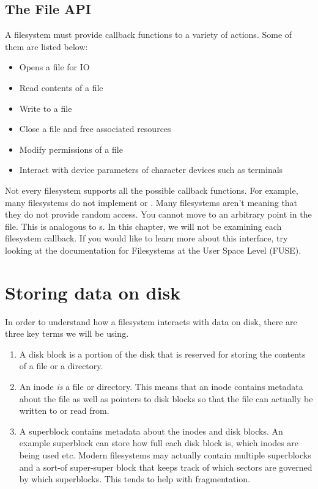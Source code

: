 \subsection{The File API}

A filesystem must provide callback functions to a variety of actions.
Some of them are listed below:

\begin{itemize}
  \item {} Opens a file for IO
  \item {} Read contents of a file
  \item {} Write to a file
  \item {} Close a file and free associated resources
  \item {} Modify permissions of a file
  \item {} Interact with device parameters of character devices such as terminals
\end{itemize}

Not every filesystem supports all the possible callback functions.
For example, many filesystems do not implement  or .
Many filesystems aren't  meaning that they do not provide random access.
You cannot move to an arbitrary point in the file.
This is analogous to s.
In this chapter, we will not be examining each filesystem callback.
If you would like to learn more about this interface, try looking at the documentation for Filesystems at the User Space Level (FUSE).

\section{Storing data on disk}

In order to understand how a filesystem interacts with data on disk, there are three key terms we will be using.
\begin{enumerate}
  \item {} A disk block is a portion of the disk that is reserved for storing the contents of a file or a directory.
  \item {} An inode \emph{is} a file or directory.
    This means that an inode contains metadata about the file as well as pointers to disk blocks so that the file can actually be written to or read from.
  \item {} A superblock contains metadata about the inodes and disk blocks.
    An example superblock can store how full each disk block is, which inodes are being used etc.
    Modern filesystems may actually contain multiple superblocks and a sort-of super-super block that keeps track of which sectors are governed by which superblocks.
    This tends to help with fragmentation.
\end{enumerate}

